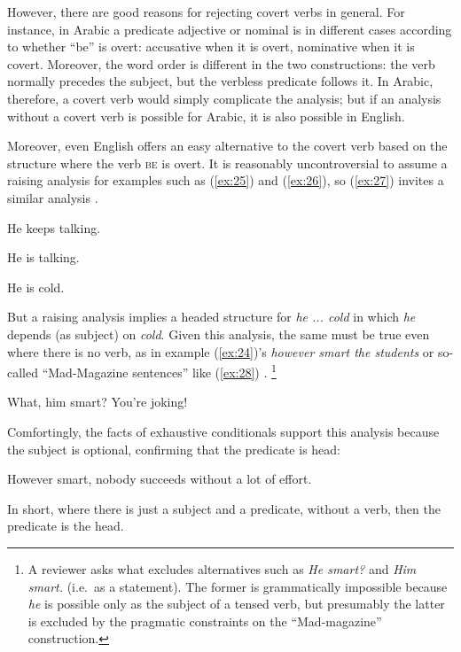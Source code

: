 \documentclass[output=paper
	        ,collection
	        ,collectionchapter
 	        ,biblatex
                ,babelshorthands
                ,newtxmath
                ,draftmode
                ,colorlinks, citecolor=brown
]{./langsci/langscibook}
\begin{document}
However, there are good reasons for rejecting covert verbs in general. For instance, in Arabic a predicate adjective or nominal is in different cases according to whether ``be'' is overt: accusative when it is overt, nominative when it is covert. Moreover, the word order is different in the two constructions: the verb normally precedes the subject, but the verbless predicate follows it. In Arabic, therefore, a covert verb would simply complicate the analysis; but if an analysis without a covert verb is possible for Arabic, it is also possible in English.

Moreover, even English offers an easy alternative to the covert verb based on the structure where the verb \textsc{be} is overt. It is reasonably uncontroversial to assume a raising analysis for examples such as (\ref{ex:25}) and (\ref{ex:26}), so (\ref{ex:27}) invites a similar analysis \citep{MuellerCopula}.

\eal
\ex \label{ex:25} He keeps talking.

\ex \label{ex:26} He is talking.

\ex \label{ex:27} He is cold.
\zl

But a raising analysis implies a headed structure for \emph{he ... cold} in which \emph{he} depends (as subject) on \emph{cold}. Given this analysis, the same must be true even where there is no verb, as in example (\ref{ex:24})'s \emph{however smart the students} or so-called ``Mad-Magazine sentences'' like (\ref{ex:28}) \citep{Lambrecht:90}.%
%
\footnote{A reviewer asks what excludes alternatives such as \emph{He smart?} and \emph{Him smart.} (i.e.\ as a statement). The former is grammatically impossible because \emph{he} is possible only as the subject of a tensed verb, but presumably the latter is excluded by the pragmatic constraints on the ``Mad-magazine'' construction.}%
%

\begin{exe}
	\ex \label{ex:28} What, him smart? You’re joking!
\end{exe}

Comfortingly, the facts of exhaustive conditionals support this analysis because the subject is optional, confirming that the predicate is head:

\begin{exe}
	\ex \label{ex:29} However smart, nobody succeeds without a lot of effort.
\end{exe}

In short, where there is just a subject and a predicate, without a verb, then the predicate is the head.
\end{document}
